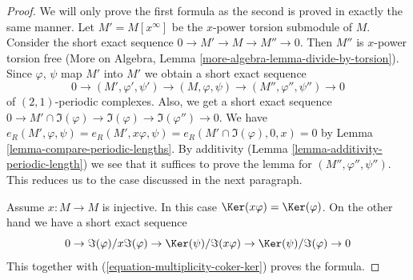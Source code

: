 \begin{proof}
We will only prove the first formula as the second is proved
in exactly the same manner.
Let $M' = M[x^\infty]$ be the $x$-power torsion submodule of $M$.
Consider the short exact sequence $0 \to M' \to M \to M'' \to 0$.
Then $M''$ is $x$-power torsion free (More on Algebra, Lemma
\ref{more-algebra-lemma-divide-by-torsion}).
Since $\varphi$, $\psi$ map $M'$ into $M'$
we obtain a short exact sequence
$$
0 \to (M', \varphi', \psi') \to (M, \varphi, \psi) \to
(M'', \varphi'', \psi'') \to 0
$$
of $(2, 1)$-periodic complexes. Also, we get a short exact sequence
$0 \to M' \cap \Im(\varphi) \to \Im(\varphi) \to \Im(\varphi'') \to 0$.
We have
$e_R(M', \varphi, \psi) = e_R(M', x\varphi, \psi) =
e_R(M' \cap \Im(\varphi), 0, x) = 0$
by Lemma \ref{lemma-compare-periodic-lengths}.
By additivity (Lemma \ref{lemma-additivity-periodic-length})
we see that it suffices to prove the lemma for $(M'', \varphi'', \psi'')$.
This reduces us to the case discussed in the next paragraph.

\medskip\noindent
Assume $x : M \to M$ is injective.
In this case $\Ker(x\varphi) = \Ker(\varphi)$.
On the other hand we have a short exact sequence
$$
0 \to \Im(\varphi)/x\Im(\varphi) \to
\Ker(\psi)/\Im(x\varphi) \to \Ker(\psi)/\Im(\varphi) \to 0
$$
This together with (\ref{equation-multiplicity-coker-ker}) proves the formula.
\end{proof}







